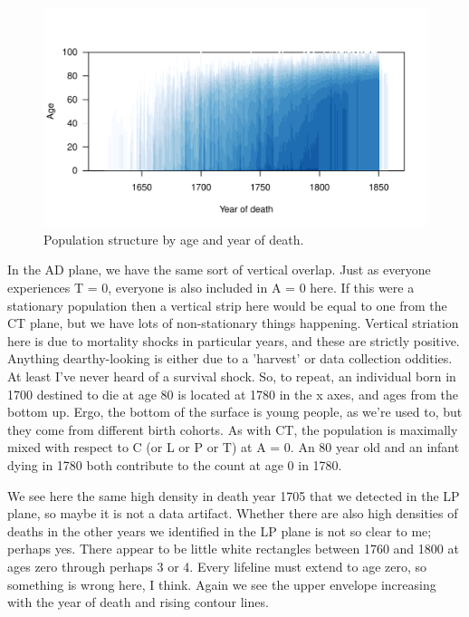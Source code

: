 \documentclass{bmcart}
\begin{document}
\begin{figure}
\includegraphics[scale=.9]{Figures/QuebecAD.pdf}
\caption{Population structure by age and year of death.}
\label{fig:adq}
\end{figure}
In the AD plane, we have the same sort of vertical overlap. Just as everyone experiences T = 0, everyone is also included in A = 0 here. If this were a stationary population then a vertical strip here would be equal to one from the CT plane, but we have lots of non-stationary things happening. Vertical striation here is due to mortality shocks in particular years, and these are strictly positive. Anything dearthy-looking is either due to a 'harvest' or data collection oddities. At least I've never heard of a survival shock. So, to repeat, an individual born in 1700 destined to die at age 80 is located at 1780 in the x axes, and ages from the bottom up. Ergo, the bottom of the surface is young people, as we're used to, but they come from different birth cohorts. As with CT, the population is maximally mixed with respect to C (or L or P or T) at A = 0. An 80 year old and an infant dying in 1780 both contribute to the count at age 0 in 1780.

We see here the same high density in death year 1705 that we detected in the LP plane, so maybe it is not a data artifact. Whether there are also high densities of deaths in the other years we identified in the LP plane is not so clear to me; perhaps yes. There appear to be little white rectangles between 1760 and 1800 at ages zero through perhaps 3 or 4. Every lifeline must extend to age zero, so something is wrong here, I think. Again we see the upper envelope increasing with the year of death and rising contour lines.
\end{document}
